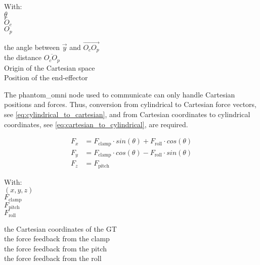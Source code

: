 \begin{minipage}[t]{0.20\textwidth}
With:\\
\hspace*{8mm} $\theta$\\
\hspace*{8mm} $r$ \\
\hspace*{8mm} $O_c$ \\
\hspace*{8mm} $O_p$ 
\end{minipage}
\begin{minipage}[t]{0.68\textwidth}
\vspace*{2mm}
the angle between $\overrightarrow{y}$ and $\overrightarrow{O_c O_p}$\\ %
the distance $\overline{O_c O_p}$\\ %
Origin of the Cartesian space\\
Position of the end-effector
\end{minipage}

The phantom\_omni node\cite{phantom_omni_github} used to communicate can only handle Cartesian positions and forces. Thus, conversion from cylindrical to Cartesian force vectors, see \eqref{eq:cylindrical_to_cartesian}, and from Cartesian coordinates to cylindrical coordinates, see \eqref{eq:cartesian_to_cylindrical}, are required.



\begin{equation} 
\begin{split}
	F_x &= F_\textrm{clamp}\cdot sin(\theta) + F_\textrm{roll}\cdot cos(\theta)\\
	F_y &= F_\textrm{clamp}\cdot cos(\theta) - F_\textrm{roll}\cdot sin(\theta)\\
	F_z &= F_\textrm{pitch}
\end{split}
\label{eq:cylindrical_to_cartesian}
\end{equation}

\begin{minipage}[t]{0.20\textwidth}
With:\\
\hspace*{8mm} $(x,y,z)$ \\
\hspace*{8mm} $F_\textrm{clamp}$ \\
\hspace*{8mm} $F_\textrm{pitch}$ \\
\hspace*{8mm} $F_\textrm{roll}$ 
\end{minipage}
\begin{minipage}[t]{0.68\textwidth}
\vspace*{2mm}
the Cartesian coordinates of the GT\\
the force feedback from the clamp\\
the force feedback from the pitch\\
the force feedback from the roll
\end{minipage}

